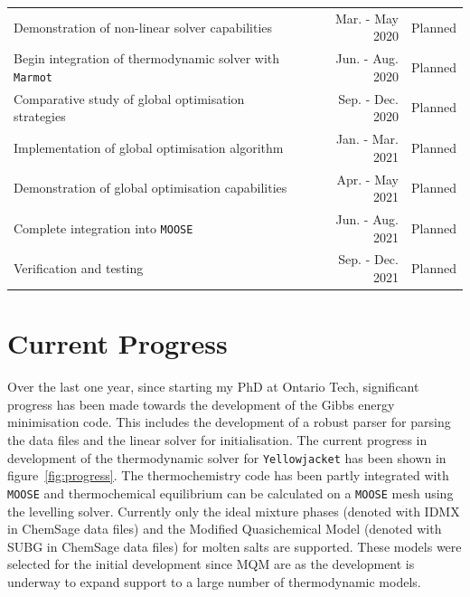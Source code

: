 \begin{table}[!htbp]
\begin{tabular}{@{}l r r@{}}
		Demonstration of non-linear solver capabilities & Mar. - May 2020 & Planned\\
		Begin integration of thermodynamic solver with \texttt{Marmot} & Jun. - Aug. 2020 & Planned\\ 
		Comparative study of global optimisation strategies & Sep. - Dec. 2020 & Planned\\
		Implementation of global optimisation algorithm & Jan. - Mar. 2021 & Planned\\
		Demonstration of global optimisation capabilities & Apr. - May 2021 & Planned\\
		Complete integration into \texttt{MOOSE} & Jun. - Aug. 2021 & Planned\\
		Verification and testing & Sep. - Dec. 2021 & Planned\\
		\bottomrule
      		\end{tabular}
	\end{table}
	
\section{Current Progress}
	Over the last one year, since starting my PhD at Ontario Tech, significant progress has been made towards the development of the Gibbs energy minimisation code. This includes the development of a robust parser for parsing the data files and the linear solver for initialisation. The current progress in development of the thermodynamic solver for \texttt{Yellowjacket} has been shown in figure~\ref{fig:progress}. The thermochemistry code has been partly integrated with \texttt{MOOSE} and thermochemical equilibrium can be calculated on a \texttt{MOOSE} mesh using the levelling solver. Currently only the ideal mixture phases (denoted with IDMX in ChemSage data files) and the Modified Quasichemical Model (denoted with SUBG in ChemSage data files) for molten salts are supported. These models were selected for the initial development since MQM  are  as the development is underway to expand support to a large number of thermodynamic models.
	
